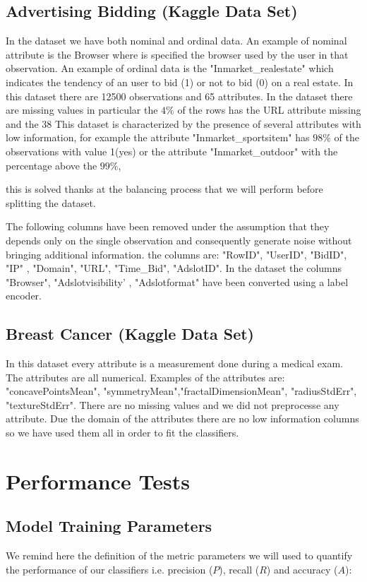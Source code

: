 \documentclass{article}
\begin{document}
\subsection{Advertising Bidding (Kaggle Data Set)}
In the dataset we have both nominal and ordinal data.
An example of nominal attribute is the Browser where is specified the browser used by the user in that observation.
An example of ordinal data is the "Inmarket\_realestate" which indicates the tendency of an user to bid (1) or not to bid (0) on a real estate. In this dataset there are 12500 observations and 65 attributes.
In the dataset there are missing values in particular the $4\%$ of the rows has the URL attribute missing and the 38%
This dataset is characterized by the presence of several attributes with low information, for example the attribute "Inmarket\_sportsitem" has $98\%$ of the observations with value 1(yes)  or the attribute "Inmarket\_outdoor" with the percentage above the $99\%$,

 this is solved thanks at the balancing process that we will perform before splitting the dataset.

The following columns have been removed under the assumption that they depends only on the single observation and consequently generate noise without bringing additional information.
the columns are: "RowID", "UserID", "BidID", "IP" , "Domain", "URL", "Time\_Bid", "AdslotID".
In the dataset the columns "Browser", "Adslotvisibility' , "Adslotformat" have been converted using a label encoder.


\subsection{Breast Cancer (Kaggle Data Set)}
In this dataset every attribute is a measurement done during a medical exam.
The attributes are all numerical.
Examples of the attributes are: "concavePointsMean", "symmetryMean","fractalDimensionMean", "radiusStdErr", "textureStdErr".
There are no missing values and we did not preprocesse any attribute. Due the domain of the attributes there are no low information columns so we have used them all in order to fit the classifiers.



\section{Performance Tests}
\subsection{Model Training Parameters}
We remind here the definition of the metric parameters we will used to quantify the performance of our classifiers i.e. precision ($P$), recall ($R$) and accuracy ($A$):
\\
\end{document}

